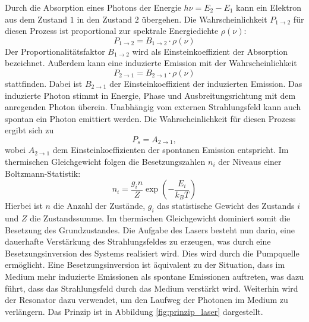 Durch die Absorption eines Photons der Energie $h \nu = E_{2} - E_{1}$ kann ein Elektron aus dem
Zustand $1$ in den Zustand ${2}$ übergehen. Die Wahrscheinlichkeit $P_{1\rightarrow 2}$ für 
diesen Prozess ist proportional zur spektrale Energiedichte $\rho(\nu)$:
\begin{equation}
	  P_{1\rightarrow 2} = B_{1\rightarrow 2}\cdot\rho(\nu)
\end{equation}
Der Proportionalitätsfaktor $B_{1\rightarrow 2}$ wird als Einsteinkoeffizient der Absorption
bezeichnet. Außerdem kann eine induzierte Emission mit der Wahrscheinlichkeit
\begin{equation}
	  P_{2\rightarrow 1} = B_{2\rightarrow 1}\cdot\rho(\nu)
\end{equation}
stattfinden. Dabei ist  $B_{2\rightarrow1}$ der Einsteinkoeffizient der induzierten Emission.
Das induzierte Photon stimmt in Energie, Phase und Ausbreitungsrichtung mit dem anregenden Photon überein.
Unabhängig vom externen Strahlungsfeld kann auch spontan ein Photon emittiert werden. Die 
Wahrscheinlichkeit für diesen Prozess ergibt sich zu
\begin{equation}
	  P_{s} = A_{2 \rightarrow 1} ,
\end{equation}
wobei $A_{2 \rightarrow 1}$ dem Einsteinkoeffizienten der spontanen Emission entspricht.
Im thermischen Gleichgewicht folgen die Besetzungszahlen $n_{i}$ der Niveaus einer
Boltzmann-Statistik:
\begin{equation}
	n_{i} = \frac{g_{i}n}{Z}\exp\left(-\frac{E_{i}}{k_{B}T}\right)
\end{equation}
Hierbei ist $n$ die Anzahl der Zustände, $g_{i}$ das statistische Gewicht des Zustands ${i}$
und $Z$ die Zustandssumme. Im thermischen Gleichgewicht dominiert somit die Besetzung 
des Grundzustandes. Die Aufgabe des Lasers besteht nun darin,
eine dauerhafte Verstärkung des Strahlungsfeldes zu erzeugen, was durch eine Besetzungsinversion
des Systems realisiert wird. Dies wird durch die Pumpquelle ermöglicht.
Eine Besetzungsinversion ist äquivalent zu der Situation, dass im Medium mehr induzierte 
Emissionen als spontane Emissionen auftreten, was dazu führt, dass das Strahlungsfeld durch
das Medium verstärkt wird.
Weiterhin wird der Resonator dazu verwendet, um den Laufweg der Photonen im Medium zu 
verlängern. Das Prinzip ist in Abbildung \ref{fig:prinzip_laser} dargestellt.

